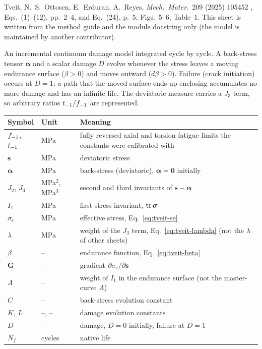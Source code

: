 \label{sheet:TVEIT2025}

 Tveit, N.~S.~Ottosen, E.~Erduran, A.~Reyes, \emph{Mech.\ Mater.}\ 209 (2025) 105452
\cite{tveit2025}, Eqs.~(1)--(12), pp.~2--4, and Eq.~(24), p.~5; Figs.~5--6, Table~1. This sheet is
written from the method guide and the module docstring only (the model is maintained by another
contributor).

 An incremental continuum damage model integrated cycle by cycle. A back-stress
tensor $\boldsymbol\alpha$ and a scalar damage $D$ evolve whenever the stress leaves a moving endurance
surface ($\beta>0$) and moves outward ($d\beta>0$). Failure (crack initiation) occurs at $D=1$; a path
that the moved surface ends up enclosing accumulates no more damage and has an infinite life. The
deviatoric measure carries a $J_3$ term, so arbitrary ratios $t_{-1}/f_{-1}$ are represented.

\begin{center}\small
\begin{tabular}{@{}llp{100mm}@{}}
\toprule
Symbol & Unit & Meaning\\\midrule
$f_{-1}$, $t_{-1}$ & MPa & fully reversed axial and torsion fatigue limits the constants were calibrated with\\
$\mathbf s$ & MPa & deviatoric stress\\
$\boldsymbol\alpha$ & MPa & back-stress (deviatoric), $\boldsymbol\alpha=\mathbf 0$ initially\\
$J_2$, $J_3$ & MPa$^2$, MPa$^3$ & second and third invariants of $\mathbf s-\boldsymbol\alpha$\\
$I_1$ & MPa & first stress invariant, $\operatorname{tr}\boldsymbol\sigma$\\
$\sigma_e$ & MPa & effective stress, Eq.~\eqref{eq:tveit-se}\\
$\lambda$ & MPa & weight of the $J_3$ term, Eq.~\eqref{eq:tveit-lambda} (not the $\lambda$ of other sheets)\\
$\beta$ & -- & endurance function, Eq.~\eqref{eq:tveit-beta}\\
$\mathbf G$ & -- & gradient $\partial\sigma_e/\partial\mathbf s$\\
$A$ & -- & weight of $I_1$ in the endurance surface (not the master-curve $A$)\\
$C$ & -- & back-stress evolution constant\\
$K$, $L$ & --, -- & damage evolution constants\\
$D$ & -- & damage, $D=0$ initially, failure at $D=1$\\
$N_f$ & cycles & native life\\
\bottomrule
\end{tabular}
\end{center}

